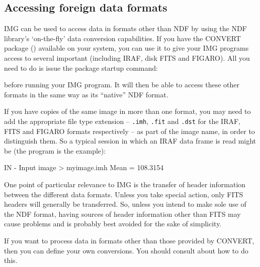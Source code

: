 \documentclass[twoside,11pt,nolof]{starlink}
\providecommand{\myverb}[1]{{\texttt{#1}}}
\newenvironment{code}{\begin{small}}
                     {\end{small}}
\begin{document}
\subsection{Accessing \label{IMGFOREIGNDATAFORMATS} foreign data formats}
IMG can be used to access data in formats other than NDF by using the
NDF library's `on-the-fly' data conversion capabilities.  If you have
the CONVERT package () available on your system,
you can use it to give your IMG programs access to several important
(including IRAF, disk FITS and FIGARO). All you need to do is issue
the package startup command:
\begin{code}
\begin{terminalv}
\end{terminalv}
\end{code}
before running your IMG program. It will then be able to access these other
formats in the same way as its ``native'' NDF format.

If you have copies of the same image in more than one format, you may
need to add the appropriate file type extension -- \myverb{.imh},
\myverb{.fit} and \myverb{.dst} for the IRAF, FITS and FIGARO formats
respectively -- as part of the image name, in order to distinguish
them.  So a typical session in which an IRAF data frame is read might
be (the program is the \htmlref{\myverb{mean}}{IMGMEAN}
example):
\begin{code}
\begin{terminalv}
IN - Input image > myimage.imh
Mean = 108.3154
%
\end{terminalv}
\end{code}

One point of particular relevance to IMG is the transfer of header
information between the different data formats. Unless you take
special action, only FITS headers will generally be transferred. So,
unless you intend to make sole use of the NDF format, having sources
of header information other than FITS may cause problems and is
probably best avoided for the sake of simplicity.

If you want to process data in formats other than those provided by
CONVERT, then you can define your own conversions. You should consult
 about how to do this.
\end{document}

